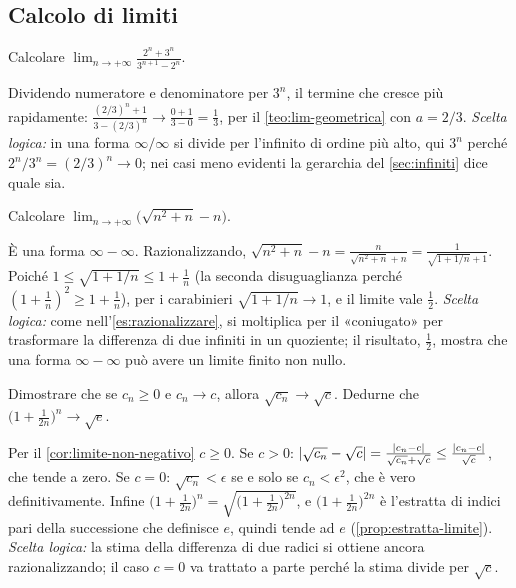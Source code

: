 \subsection*{Calcolo di limiti}

\begin{esercizio}
Calcolare $\displaystyle\lim_{n\to+\infty}\frac{2^{n}+3^{n}}{3^{n+1}-2^{n}}$.
\begin{soluzione}
Dividendo numeratore e denominatore per $3^{n}$, il termine che cresce più rapidamente:
$\frac{(2/3)^{n}+1}{3-(2/3)^{n}}\to\frac{0+1}{3-0}=\frac13$, per il
\cref{teo:lim-geometrica} con $a=2/3$. \emph{Scelta logica:} in una forma $\infty/\infty$ si
divide per l'infinito di ordine più alto, qui $3^{n}$ perché $2^{n}/3^{n}=(2/3)^{n}\to0$;
nei casi meno evidenti la gerarchia del \cref{sec:infiniti} dice quale sia.
\end{soluzione}
\end{esercizio}

\begin{esercizio}
Calcolare $\displaystyle\lim_{n\to+\infty}\bigl(\sqrt{n^{2}+n}-n\bigr)$.
\begin{soluzione}
È una forma $\infty-\infty$. Razionalizzando,
$\sqrt{n^{2}+n}-n=\frac{n}{\sqrt{n^{2}+n}+n}=\frac{1}{\sqrt{1+1/n}+1}$. Poiché
$1\le\sqrt{1+1/n}\le1+\frac1n$ (la seconda disuguaglianza perché
$(1+\frac1n)^{2}\ge1+\frac1n$), per i carabinieri $\sqrt{1+1/n}\to1$, e il limite vale
$\frac12$. \emph{Scelta logica:} come nell'\cref{es:razionalizzare}, si moltiplica per il
«coniugato» per trasformare la differenza di due infiniti in un quoziente; il risultato,
$\frac12$, mostra che una forma $\infty-\infty$ può avere un limite finito non nullo.
\end{soluzione}
\end{esercizio}

\begin{esercizio}\label{es:radice-continua}
Dimostrare che se $c_{n}\ge0$ e $c_{n}\to c$, allora $\sqrt{c_{n}}\to\sqrt c$. Dedurne
che $\bigl(1+\frac1{2n}\bigr)^{n}\to\sqrt e$.
\begin{soluzione}
Per il \cref{cor:limite-non-negativo} $c\ge0$. Se $c>0$:
$\lvert \sqrt{c_{n}}-\sqrt c\rvert=\frac{\lvert c_{n}-c\rvert}{\sqrt{c_{n}}+\sqrt c}\le\frac{\lvert c_{n}-c\rvert}{\sqrt c}$,
che tende a zero. Se $c=0$: $\sqrt{c_{n}}<\epsilon$ se e solo se $c_{n}<\epsilon^{2}$, che è
vero definitivamente. Infine
$\bigl(1+\frac1{2n}\bigr)^{n}=\sqrt{\bigl(1+\frac1{2n}\bigr)^{2n}}$, e
$\bigl(1+\frac1{2n}\bigr)^{2n}$ è l'estratta di indici pari della successione che definisce
$e$, quindi tende ad $e$ (\cref{prop:estratta-limite}). \emph{Scelta logica:} la stima
della differenza di due radici si ottiene ancora razionalizzando; il caso $c=0$ va trattato
a parte perché la stima divide per $\sqrt c$.
\end{soluzione}
\end{esercizio}


